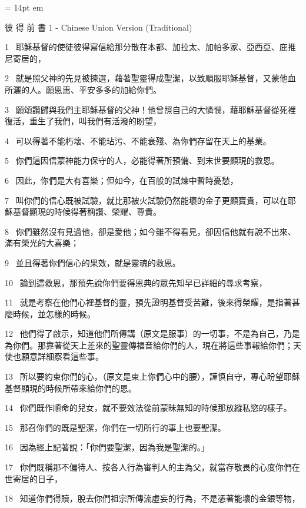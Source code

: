 
\FFrh \baselineskip = 14pt
 em


\centerline{  \FFbg
彼 得 前 書 1 - Chinese Union Version (Traditional) }

\par
1 
耶穌基督的使徒彼得寫信給那分散在本都、加拉太、加帕多家、亞西亞、庇推尼寄居的，
\par
2 
就是照父神的先見被揀選，藉著聖靈得成聖潔，以致順服耶穌基督，又蒙他血所灑的人。願恩惠、平安多多的加給你們。
\par
3 
願頌讚歸與我們主耶穌基督的父神！他曾照自己的大憐憫，藉耶穌基督從死裡復活，重生了我們，叫我們有活潑的盼望，
\par
4 
可以得著不能朽壞、不能玷污、不能衰殘、為你們存留在天上的基業。
\par
5 
你們這因信蒙神能力保守的人，必能得著所預備、到末世要顯現的救恩。
\par
6 
因此，你們是大有喜樂；但如今，在百般的試煉中暫時憂愁，
\par
7 
叫你們的信心既被試驗，就比那被火試驗仍然能壞的金子更顯寶貴，可以在耶穌基督顯現的時候得著稱讚、榮耀、尊貴。
\par
8 
你們雖然沒有見過他，卻是愛他；如今雖不得看見，卻因信他就有說不出來、滿有榮光的大喜樂；
\par
9 
並且得著你們信心的果效，就是靈魂的救恩。
\par
10 
論到這救恩，那預先說你們要得恩典的眾先知早已詳細的尋求考察，
\par
11 
就是考察在他們心裡基督的靈，預先證明基督受苦難，後來得榮耀，是指著甚麼時候，並怎樣的時候。
\par
12 
他們得了啟示，知道他們所傳講（原文是服事）的一切事，不是為自己，乃是為你們。那靠著從天上差來的聖靈傳福音給你們的人，現在將這些事報給你們；天使也願意詳細察看這些事。
\par
13 
所以要約束你們的心，（原文是束上你們心中的腰），謹慎自守，專心盼望耶穌基督顯現的時候所帶來給你們的恩。
\par
14 
你們既作順命的兒女，就不要效法從前蒙昧無知的時候那放縱私慾的樣子。
\par
15 
那召你們的既是聖潔，你們在一切所行的事上也要聖潔。
\par
16 
因為經上記著說：「你們要聖潔，因為我是聖潔的。」
\par
17 
你們既稱那不偏待人、按各人行為審判人的主為父，就當存敬畏的心度你們在世寄居的日子，
\par
18 
知道你們得贖，脫去你們祖宗所傳流虛妄的行為，不是憑著能壞的金銀等物，
\par
